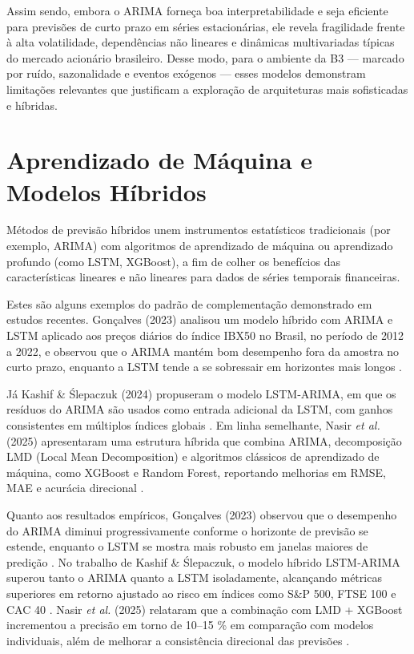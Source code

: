 Assim sendo, embora o ARIMA forneça boa interpretabilidade e seja eficiente para previsões de curto prazo em séries estacionárias, ele revela fragilidade frente à alta volatilidade, dependências não lineares e dinâmicas multivariadas típicas do mercado acionário brasileiro. Desse modo, para o ambiente da B3 — marcado por ruído, sazonalidade e eventos exógenos — esses modelos demonstram limitações relevantes que justificam a exploração de arquiteturas mais sofisticadas e híbridas.




\section{Aprendizado de Máquina e Modelos Híbridos}

Métodos de previsão híbridos unem instrumentos estatísticos tradicionais (por exemplo, ARIMA) com algoritmos de aprendizado de máquina ou aprendizado profundo (como LSTM, XGBoost), a fim de colher os benefícios das características lineares e não lineares para dados de séries temporais financeiras.

Estes são alguns exemplos do padrão de complementação demonstrado em estudos recentes. Gonçalves (2023) analisou um modelo híbrido com ARIMA e LSTM aplicado aos preços diários do índice IBX50 no Brasil, no período de 2012 a 2022, e observou que o ARIMA mantém bom desempenho fora da amostra no curto prazo, enquanto a LSTM tende a se sobressair em horizontes mais longos \cite{goncalves2023impacto}.

Já Kashif \& Ślepaczuk (2024) propuseram o modelo LSTM‑ARIMA, em que os resíduos do ARIMA são usados como entrada adicional da LSTM, com ganhos consistentes em múltiplos índices globais \cite{kashif2024lstm}. Em linha semelhante, Nasir \textit{et al.} (2025) apresentaram uma estrutura híbrida que combina ARIMA, decomposição LMD (Local Mean Decomposition) e algoritmos clássicos de aprendizado de máquina, como XGBoost e Random Forest, reportando melhorias em RMSE, MAE e acurácia direcional \cite{nasir2025lmd}.

Quanto aos resultados empíricos, Gonçalves (2023) observou que o desempenho do ARIMA diminui progressivamente conforme o horizonte de previsão se estende, enquanto o LSTM se mostra mais robusto em janelas maiores de predição \cite{goncalves2023impacto}. No trabalho de Kashif \& Ślepaczuk, o modelo híbrido LSTM‑ARIMA superou tanto o ARIMA quanto a LSTM isoladamente, alcançando métricas superiores em retorno ajustado ao risco em índices como S\&P 500, FTSE 100 e CAC 40 \cite{kashif2024lstm}. Nasir \textit{et al.} (2025) relataram que a combinação com LMD + XGBoost incrementou a precisão em torno de 10–15 \% em comparação com modelos individuais, além de melhorar a consistência direcional das previsões \cite{nasir2025lmd}.

